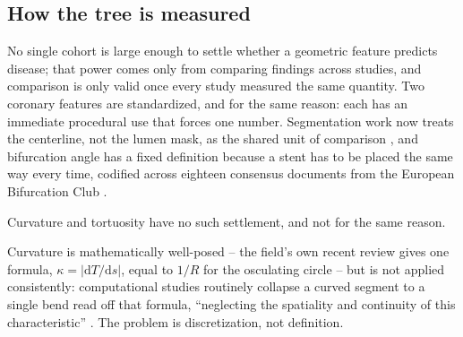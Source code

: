 
\subsection{How the tree is measured}
\label{sec:gap-how}

No single cohort is large enough to settle whether a geometric feature predicts disease; that
power comes only from comparing findings across studies, and comparison is only valid once every
study measured the same quantity.
Two coronary features are standardized, and for the same reason: each has an immediate procedural
use that forces one number.
Segmentation work now treats the centerline, not the lumen mask, as the shared unit of comparison
\cite{shit2021cldice, zhang2024adehtl, nannini2024characterization}, and bifurcation angle has a
fixed definition because a stent has to be placed the same way every time, codified across eighteen
consensus documents from the European Bifurcation Club \cite{burzotta2024ebc}.

Curvature and tortuosity have no such settlement, and not for the same reason.

Curvature is mathematically well-posed -- the field's own recent review gives one formula,
$\kappa = |\mathrm{d}T/\mathrm{d}s|$, equal to $1/R$ for the osculating circle -- but is not applied
consistently: computational studies routinely collapse a curved segment to a single bend read off
that formula, ``neglecting the spatiality and continuity of this characteristic''
\cite{shen2026geometry}.
The problem is discretization, not definition.

